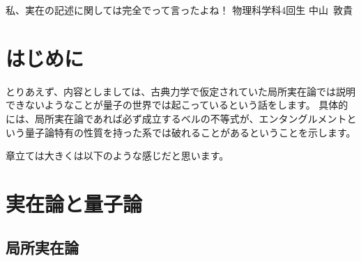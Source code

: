 \documentclass[10pt,b5paper,papersize,dvipdfmx]{jsbook}
\begin{document}

\newcommand\karizu[1]{\begin{center}（図：#1）\end{center}}

\newif\ifsecI
\newif\ifsecII

\secItrue
\secIItrue


\kaishititle%
  {私、実在の記述に関しては完全でって言ったよね！}%
  {物理科学科4回生}%
  {中山~敦貴}%


\section*{はじめに}
とりあえず、内容としましては、古典力学で仮定されていた局所実在論では説明できないようなことが量子の世界では起こっているという話をします。
具体的には、局所実在論であれば必ず成立するベルの不等式が、エンタングルメントという量子論特有の性質を持った系では破れることがあるということを示します。\par
章立ては大きくは以下のような感じだと思います。


\ifsecI
\section{実在論と量子論}

%
\subsection{局所実在論} %
\end{document}
